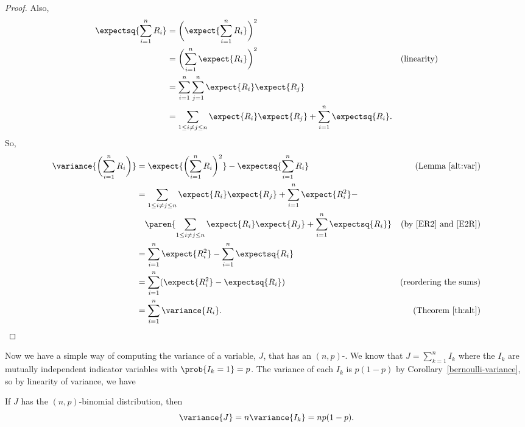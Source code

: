\begin{editingnotes}
\begin{proof}
Also,
\begin{align}
\expectsq{\sum_{i=1}^n R_i} & = \biggl(\expect{\sum_{i=1}^n R_i}\biggr)^2 \notag\\
  &  = \biggl(\sum_{i=1}^n \expect{R_i}\biggr)^2 &\text{(linearity)} \notag\\
  &  = \sum_{i=1}^n \sum_{j=1}^n \expect{R_i} \expect{R_j}\notag\\
  & = \sum_{1\le i \neq j \le n} \expect{R_i}\expect{R_j} + \sum_{i=1}^n
     \expectsq{R_i}.\label{E2R}
\end{align}
So,
\begin{align*}
\variance{\biggl(\sum_{i=1}^n R_i\biggr)}
   & =  \expect{\biggl(\sum_{i=1}^n R_i\biggr)^2} -
\expectsq{\sum_{i=1}^n R_i}  & \text{(Lemma~\ref{alt:var})}\\
   &  = \sum_{1\le i \neq j \le n} \expect{R_i} \expect{R_j}
        + \sum_{i=1}^n \expect{R_i^2} - \\
   & \quad \paren{\sum_{1\le i \neq j \le n} \expect{R_i}\expect{R_j}
        + \sum_{i=1}^n \expectsq{R_i}}
      & \text{(by~\eqref{ER2} and~\eqref{E2R})}\\
   & = \sum_{i=1}^n \expect{R_i^2} - \sum_{i=1}^n \expectsq{R_i}\\
   & = \sum_{i=1}^n (\expect{R_i^2} - \expectsq{R_i})
             & \text{(reordering the sums)}\\
   & = \sum_{i=1}^n \variance{R_i}. & \text{(Theorem~\ref{th:alt})}
\end{align*}
\fi
\end{proof}
\end{editingnotes}


Now we have a simple way of computing the variance of a variable, $J$,
that has an $(n,p)$-.  We know that $J =
\sum_{k=1}^n I_k$ where the $I_k$ are mutually independent indicator
variables with $\prob{I_k=1}=p$.  The variance of each $I_k$ is $p(1-p)$
by Corollary~\ref{bernoulli-variance}, so by linearity of variance, we have
\begin{lemma*}
If $J$ has the $(n,p)$-binomial distribution, then
\begin{equation}\label{p1p}
\variance{J} = n \variance{I_k} = np(1-p).
\end{equation}
\end{lemma*}

\begin{problems}
\practiceproblems
{}

\classproblems
{}

\homeworkproblems
{}

\examproblems
{}
\end{problems}

